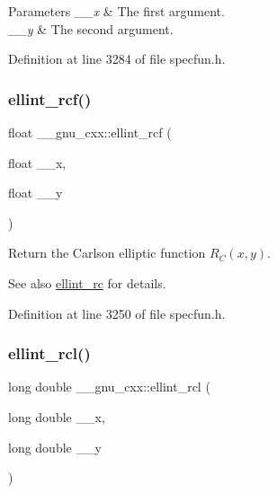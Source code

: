 \begin{DoxyParams}{Parameters}
{\em \+\_\+\+\_\+x} & The first argument. \\
\hline
{\em \+\_\+\+\_\+y} & The second argument. \\
\hline
\end{DoxyParams}


Definition at line 3284 of file specfun.\+h.

\mbox{\label{group__gnu__math__spec__func_gaad5316092224ec3d92b66e79ef266adf}} 
\subsubsection{\texorpdfstring{ellint\+\_\+rcf()}{ellint\_rcf()}}
{\footnotesize\ttfamily float \+\_\+\+\_\+gnu\+\_\+cxx\+::ellint\+\_\+rcf (\begin{DoxyParamCaption}\item[{float}]{\+\_\+\+\_\+x,  }\item[{float}]{\+\_\+\+\_\+y }\end{DoxyParamCaption})\hspace{0.3cm}{\ttfamily [inline]}}

Return the Carlson elliptic function $ R_C(x,y) $.

\begin{DoxySeeAlso}{See also}
\hyperlink{group__gnu__math__spec__func_ga7d3d42f5f71a74266be8aaca528056bf}{ellint\+\_\+rc} for details. 
\end{DoxySeeAlso}


Definition at line 3250 of file specfun.\+h.

\mbox{\label{group__gnu__math__spec__func_ga9b2f1cdeacd3615c702a77d995a0129c}} 
\subsubsection{\texorpdfstring{ellint\+\_\+rcl()}{ellint\_rcl()}}
{\footnotesize\ttfamily long double \+\_\+\+\_\+gnu\+\_\+cxx\+::ellint\+\_\+rcl (\begin{DoxyParamCaption}\item[{long double}]{\+\_\+\+\_\+x,  }\item[{long double}]{\+\_\+\+\_\+y }\end{DoxyParamCaption})\hspace{0.3cm}{\ttfamily [inline]}}

